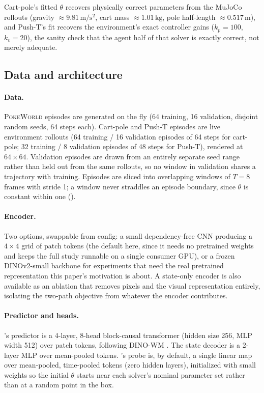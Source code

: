 Cart-pole's fitted $\theta$ recovers physically correct parameters
from the MuJoCo rollouts (gravity $\approx 9.81\,\mathrm{m/s^2}$, cart
mass $\approx 1.01\,\mathrm{kg}$, pole half-length $\approx
0.517\,\mathrm{m}$), and Push-T's fit recovers the environment's exact
controller gains ($k_p{=}100$, $k_v{=}20$), the sanity check that the
agent half of that solver is exactly correct, not merely adequate.

\subsection{Data and architecture}
\label{sec:setup-data}

\paragraph{Data.} \textsc{PokeWorld} episodes are generated on the
fly (64 training, 16 validation, disjoint random seeds, 64 steps each).
Cart-pole and Push-T episodes are live environment rollouts (64
training / 16 validation episodes of 64 steps for cart-pole; 32
training / 8 validation episodes of 48 steps for Push-T), rendered at
$64\times64$. Validation episodes are drawn from an entirely separate
seed range rather than held out from the same rollouts, so no window
in validation shares a trajectory with training. Episodes are sliced
into overlapping windows of $T{=}8$ frames with stride 1; a window
never straddles an episode boundary, since $\theta$ is constant within
one ().

\paragraph{Encoder.} Two options, swappable from config: a small
dependency-free CNN producing a $4\times4$ grid of patch tokens
(the default here, since it needs no pretrained weights and keeps the
full study runnable on a single consumer GPU), or a frozen DINOv2-small
backbone for experiments that need the real pretrained representation
this paper's motivation is about. A state-only encoder is also
available as an ablation that removes pixels and the visual
representation entirely, isolating the two-path objective from
whatever the encoder contributes.

\paragraph{Predictor and heads.} \pathA's predictor is a 4-layer,
8-head block-causal transformer (hidden size 256, MLP width 512) over
patch tokens, following DINO-WM \citep{zhou2024dinowm}. The state
decoder is a 2-layer MLP over mean-pooled tokens. \pathB's probe is,
by default, a single linear map over mean-pooled, time-pooled tokens
(zero hidden layers), initialized with small weights so the initial
$\theta$ starts near each solver's nominal parameter set rather than
at a random point in the box.


